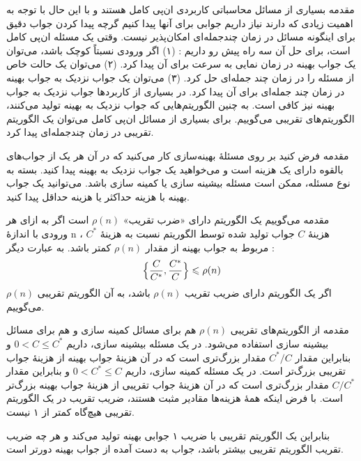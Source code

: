 \begin{itemframe}{مقدمه}
\itm
بسیاری از مسائل محاسباتی کاربردی ان‌پی کامل هستند و با این حال با توجه به اهمیت زیادی که دارند نیاز داریم جوابی برای آنها پیدا کنیم گرچه پیدا کردن جواب دقیق برای اینگونه مسائل در زمان چندجمله‌ای امکان‌پذیر نیست.
\itm
وقتی یک مسئله ان‌پی کامل است، برای حل آن سه راه پیش رو داریم : (۱) اگر ورودی نسبتاً کوچک باشد، می‌توان یک جواب بهینه در زمان نمایی به سرعت برای آن پیدا کرد. (۲) می‌توان یک حالت خاص از مسئله را در زمان چند جمله‌ای حل کرد. (۳) می‌توان یک جواب نزدیک به جواب بهینه در زمان چند جمله‌ای برای آن پیدا کرد. در بسیاری از کاربردها جواب نزدیک به جواب بهینه
نیز کافی است. به چنین الگوریتم‌هایی که جواب نزدیک به بهینه تولید می‌کنند، الگوریتم‌های تقریبی
می‌گوییم. برای بسیاری از مسائل ان‌پی کامل می‌توان یک الگوریتم تقریبی در زمان چندجمله‌ای پیدا کرد.
\end{itemframe}

\begin{itemframe}{مقدمه}
\itm
فرض کنید بر روی مسئلهٔ بهینه‌سازی کار می‌کنید که در آن هر یک از جواب‌های بالقوه
دارای یک هزینه است و می‌خواهید یک جواب نزدیک به بهینه پیدا کنید. بسته به نوع مسئله، ممکن است مسئله بیشینه سازی
یا کمینه سازی
باشد. می‌توانید یک جواب بهینه با هزینه حداکثر یا هزینه حداقل پیدا کنید.
\end{itemframe}
\begin{itemframe}{مقدمه}
\itm
می‌گوییم یک الگوریتم دارای «ضرب تقریب»
$\rho(n)$
است اگر به ازای هر ورودی با اندازهٔ n ، هزینهٔ
$C$
جواب تولید شده توسط الگوریتم نسبت به هزینهٔ
$C^*$
مربوط به جواب بهینه از مقدار
$\rho(n)$
کمتر باشد. به عبارت دیگر :
$$
\Bigl\{ \frac{C}{C^*}, \frac{C^*}{C} \Bigr\} \leqslant \rho(n)
$$
\itm
اگر یک الگوریتم دارای ضریب تقریب
$\rho(n)$
باشد، به آن الگوریتم تقریبی
$\rho(n)$
می‌گوییم.
\end{itemframe}

\begin{itemframe}{مقدمه}
\itm
از الگوریتم‌های تقریبی
$\rho(n)$
هم برای مسائل کمینه سازی و هم برای مسائل بیشینه سازی استفاده می‌شود.
\itm
در یک مسئله بیشینه سازی، داریم
$0 < C \leqslant C^*$
و بنابراین مقدار
$C^*/C$
مقدار بزرگ‌تری است که در آن هزینهٔ جواب بهینه از هزینهٔ جواب تقریبی بزرگ‌تر است.
\itm
در یک مسئله کمینه سازی، داریم
$0 < C^* \leqslant C$
و بنابراین مقدار
$C/C^*$
مقدار بزرگ‌تری است که در آن هزینهٔ جواب تقریبی از هزینهٔ جواب بهینه بزرگ‌تر است.
\itm
با فرض اینکه همهٔ هزینه‌ها مقادیر مثبت هستند، ضریب تقریب در یک الگوریتم تقریبی هیچ‌گاه کمتر از ۱ نیست.
\iffalse
 زیرا اگر داشته باشیم
$C/C^* \leqslant 1$
آنگاه
$C^*/C \geqslant 1$
.
\fi
\itm
بنابراین یک الگوریتم تقریبی با ضریب ۱ جوابی بهینه تولید می‌کند و هر چه ضریب تقریب الگوریتم تقریبی بیشتر باشد، جواب به دست آمده از جواب بهینه دورتر است.
\end{itemframe}

